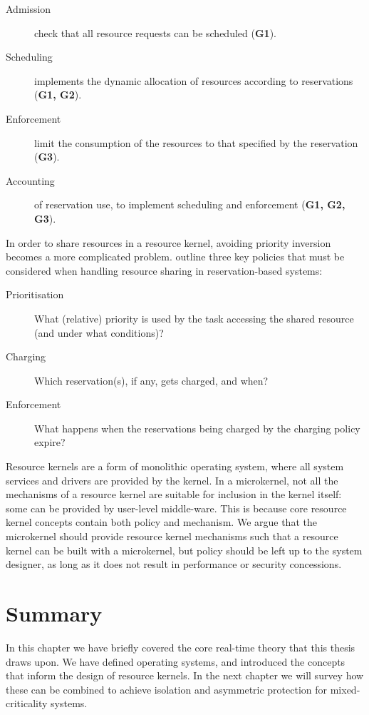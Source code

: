 \begin{description}
	\item[Admission] check that all resource requests can be scheduled (\textbf{G1}).
	\item[Scheduling] implements the dynamic allocation of resources according to reservations (\textbf{G1, G2}).
	\item[Enforcement] limit the consumption of the resources to that specified by the
        reservation (\textbf{G3}).
	\item[Accounting] of reservation use, to implement scheduling and enforcement (\textbf{G1, G2, G3}).
\end{description}

In order to share resources in a resource kernel, avoiding priority inversion becomes a more
complicated problem.  \citet{deNiz_LSR_01} outline three key policies that must be considered when
handling resource sharing in reservation-based systems:

\begin{description}
    \item[Prioritisation] What (relative) priority is used by the task accessing the shared resource (and under what conditions)?
    \item[Charging] Which reservation(s), if any, gets charged, and when?
    \item[Enforcement] What happens when the reservations being charged by the charging policy expire?
\end{description}

Resource kernels are a form of monolithic operating system, where all system services and drivers
are provided by the kernel.  In a microkernel, not all the mechanisms of a resource kernel are
suitable for inclusion in the kernel itself: some can be provided by user-level middle-ware.  This
is because core resource kernel concepts contain both policy and mechanism.  We argue that the
microkernel should provide resource kernel mechanisms such that a resource kernel can be built with
a microkernel, but policy should be left up to the system designer, as long as it does not result in
performance or security concessions.

\section{Summary}

In this chapter we have briefly covered the core real-time theory that this thesis draws upon.
We have defined operating systems, and introduced the concepts that inform the design of resource kernels.
In the next chapter we will survey how these can be combined to achieve isolation and asymmetric protection for mixed-criticality systems.
